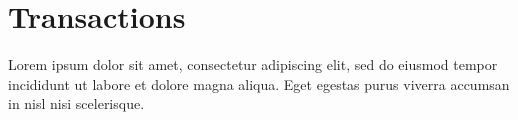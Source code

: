 \section{Transactions}
\label{sec:transactions}

Lorem ipsum dolor sit amet, consectetur adipiscing elit, sed do eiusmod tempor incididunt ut labore et dolore magna aliqua. Eget egestas purus viverra accumsan in nisl nisi scelerisque.
